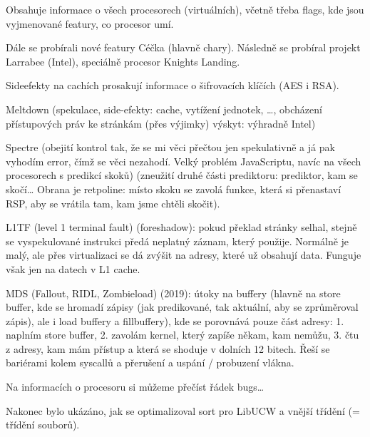 \documentclass[12pt]{article}                   %
\begin{document}
        \begin{definice}
            Obsahuje informace o všech procesorech (virtuálních), včetně třeba flags, kde jsou vyjmenované featury, co procesor umí.
        \end{definice}


        Dále se probírali nové featury Céčka (hlavně chary). Následně se probíral projekt Larrabee (Intel), speciálně procesor Knights Landing.

        \begin{poznamka}
            Sideefekty na cachích prosakují informace o šifrovacích klíčích (AES i RSA).

            Meltdown (spekulace, side-efekty: cache, vytížení jednotek, …, obcházení přístupových práv ke stránkám (přes výjimky) výskyt: výhradně Intel)


            Spectre (obejití kontrol tak, že se mi věci přečtou jen spekulativně a já pak vyhodím error, čímž se věci nezahodí. Velký problém JavaScriptu, navíc na všech procesorech s predikcí skoků) (zneužití druhé části prediktoru: prediktor, kam se skočí… Obrana je retpoline: místo skoku se zavolá funkce, která si přenastaví RSP, aby se vrátila tam, kam jsme chtěli skočit).

            L1TF (level 1 terminal fault) (foreshadow): pokud překlad stránky selhal, stejně se vyspekulované instrukci předá neplatný záznam, který použije. Normálně je malý, ale přes virtualizaci se dá zvýšit na adresy, které už obsahují data. Funguje však jen na datech v L1 cache.

            MDS (Fallout, RIDL, Zombieload) (2019): útoky na buffery (hlavně na store buffer, kde se hromadí zápisy (jak predikované, tak aktuální, aby se zprůměroval zápis), ale i load buffery a fillbuffery), kde se porovnává pouze část adresy: 1. naplním store buffer, 2. zavolám kernel, který zapíše někam, kam nemůžu, 3. čtu z adresy, kam mám přístup a která se shoduje v dolních 12 bitech. Řeší se bariérami kolem syscallů a přerušení a uspání / probuzení vlákna.

            Na informacích o procesoru si můžeme přečíst řádek bugs…
        \end{poznamka}


        \begin{poznamka}
            Nakonec bylo ukázáno, jak se optimalizoval sort pro LibUCW a vnější třídění (= třídění souborů).
        \end{poznamka}
\end{document}
